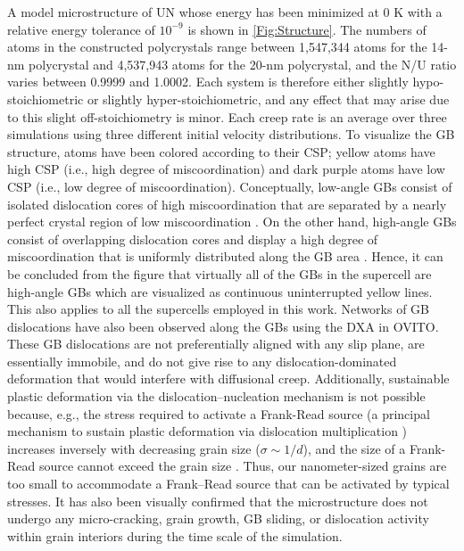 \documentclass[preprint, 12pt]{elsarticle}
\newcommand{\?}{\stackrel{?}{=}}
\begin{document}
A model microstructure of UN whose energy has been minimized at 0 K with a relative energy tolerance of $10^{-9}$ is shown in \cref{Fig:Structure}. The numbers of atoms in the constructed polycrystals range between 1,547,344 atoms for the 14-nm polycrystal and 4,537,943 atoms for the 20-nm polycrystal, and the N/U ratio varies between 0.9999 and 1.0002. Each system is therefore either slightly hypo-stoichiometric or slightly hyper-stoichiometric, and any effect that may arise due to this slight off-stoichiometry is minor. Each creep rate is an average over three simulations using three different initial velocity distributions. To visualize the GB structure, atoms have been colored according to their CSP; yellow atoms have high CSP (i.e., high degree of miscoordination) and dark purple atoms have low CSP (i.e., low degree of miscoordination). Conceptually, low-angle GBs consist of isolated dislocation cores of high miscoordination that are separated by a nearly perfect crystal region of low miscoordination \cite{Keblinski1999}. On the other hand, high-angle GBs consist of overlapping dislocation cores and display a high degree of miscoordination that is uniformly distributed along the GB area \cite{Haslam2004}. Hence, it can be concluded from the figure that virtually all of the GBs in the supercell are high-angle GBs which are visualized as continuous uninterrupted yellow lines. This also applies to all the supercells employed in this work. Networks of GB dislocations have also been observed along the GBs using the DXA in OVITO. These GB dislocations are not preferentially aligned with any slip plane, are essentially immobile, and do not give rise to any dislocation-dominated deformation that would interfere with diffusional creep. Additionally, sustainable plastic deformation via the dislocation–nucleation mechanism is not possible because, e.g., the stress required to activate a Frank-Read source (a principal mechanism to sustain plastic deformation via dislocation multiplication \cite{Murty2013}) increases inversely with decreasing grain size ($\sigma \sim 1/d$), and the size of a Frank-Read source cannot exceed the grain size \cite{Yamakov2001, Yamakov2002}. Thus, our nanometer-sized grains are too small to accommodate a Frank–Read source that can be activated by typical stresses. It has also been visually confirmed that the microstructure does not undergo any micro-cracking, grain growth, GB sliding, or dislocation activity within grain interiors during the time scale of the simulation.
\end{document}
